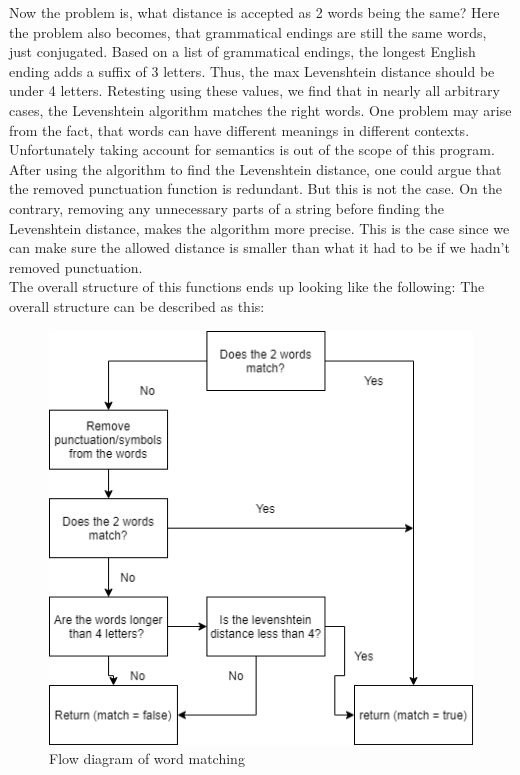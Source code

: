 Now the problem is, what distance is accepted as 2 words being the same?
Here the problem also becomes, that grammatical endings are still the same words, just conjugated.
Based on a list of grammatical endings, the longest English ending adds a suffix of 3 letters\cite{grammar_endings}. Thus,
the max Levenshtein distance should be under 4 letters.
Retesting using these values, we find that in nearly all arbitrary cases, the Levenshtein algorithm matches the right words.
One problem may arise from the fact, that words can have different meanings in different contexts. Unfortunately taking account for semantics is out of the scope of this program. \\

After using the algorithm to find the Levenshtein distance, one could argue that the removed punctuation function is redundant. But this is not the case. On the contrary, removing any
unnecessary parts of a string before finding the Levenshtein distance, makes the algorithm more precise. This is the case since we can make sure the allowed distance
is smaller than what it had to be if we hadn't removed punctuation. \\

The overall structure of this functions ends up looking like the following: %
\newpage
The overall structure can be described as this:
\begin{figure}[H]
  \centering
  \includegraphics[scale = 0.55]{figures/is_match}
  \caption{Flow diagram of word matching}\label{fig:is_match}
\end{figure}

